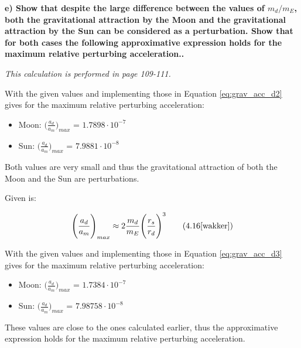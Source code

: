 \noindent \textbf{e) Show that despite the large difference between the values of $m_d/m_E$, both the gravitational attraction by the Moon and the gravitational attraction by the Sun can be considered as a perturbation. Show that for both cases the following approximative expression holds for the maximum relative perturbing acceleration..}

\bigskip

\noindent \textit{This calculation is performed in \cite{wakker} page 109-111.}

\bigskip

\noindent With the given values and implementing those in Equation \ref{eq:grav_acc_d2} gives for the maximum relative perturbing acceleration:

\begin{itemize}
    \item Moon: $\big( \frac{a_{d}}{a_{m}} \big)_{max}$ = $1.7898\cdot10^{-7}$
    \item Sun: $\big( \frac{a_{d}}{a_{m}} \big)_{max}$ = $7.9881\cdot10^{-8}$
\end{itemize}

\noindent Both values are very small and thus the gravitational attraction of both the Moon and the Sun are perturbations.

\bigskip

\noindent Given is:

\begin{equation}
    \Bigg( \frac{a_{d}}{a_{m}} \Bigg)_{max} \approx 2 \frac{m_{d}}{m_{E}} \Bigg( \frac{r_{s}}{r_{d}} \Bigg) ^3
    \tag{4.16\cite{wakker}}
    \label{eq:grav_acc_d3}
\end{equation}

\bigskip

\noindent With the given values and implementing those in Equation \ref{eq:grav_acc_d3} gives for the maximum relative perturbing acceleration:

\begin{itemize}
    \item Moon: $\big( \frac{a_{d}}{a_{m}} \big)_{max}$ = $1.7384\cdot10^{-7}$
    \item Sun: $\big( \frac{a_{d}}{a_{m}} \big)_{max}$ = $7.98758\cdot10^{-8}$
\end{itemize}

\noindent These values are close to the ones calculated earlier, thus the approximative expression holds for the maximum relative perturbing acceleration.